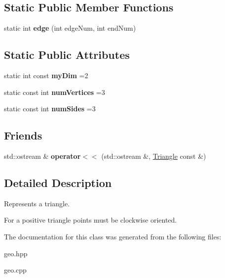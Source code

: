 \subsection*{Static Public Member Functions}
\begin{DoxyCompactItemize}
\item 
\hypertarget{classGeometry_1_1Triangle_a5a2841006b4fc7c7fdaeed465a3d6022}{static int {\bfseries edge} (int edge\-Num, int end\-Num)}\label{classGeometry_1_1Triangle_a5a2841006b4fc7c7fdaeed465a3d6022}

\end{DoxyCompactItemize}
\subsection*{Static Public Attributes}
\begin{DoxyCompactItemize}
\item 
\hypertarget{classGeometry_1_1Triangle_adeadc57151f9219dbcb15331cc493358}{static int const {\bfseries my\-Dim} =2}\label{classGeometry_1_1Triangle_adeadc57151f9219dbcb15331cc493358}

\item 
\hypertarget{classGeometry_1_1Triangle_a4804d3a14277f1dd0e67f082acfd093c}{static const int {\bfseries num\-Vertices} =3}\label{classGeometry_1_1Triangle_a4804d3a14277f1dd0e67f082acfd093c}

\item 
\hypertarget{classGeometry_1_1Triangle_a335cfc0f7a8e8115ef6734a1ad669053}{static const int {\bfseries num\-Sides} =3}\label{classGeometry_1_1Triangle_a335cfc0f7a8e8115ef6734a1ad669053}

\end{DoxyCompactItemize}
\subsection*{Friends}
\begin{DoxyCompactItemize}
\item 
\hypertarget{classGeometry_1_1Triangle_a93d57570a22ade3a22d7d7926929bcf0}{std\-::ostream \& {\bfseries operator$<$$<$} (std\-::ostream \&, \hyperlink{classGeometry_1_1Triangle}{Triangle} const \&)}\label{classGeometry_1_1Triangle_a93d57570a22ade3a22d7d7926929bcf0}

\end{DoxyCompactItemize}


\subsection{Detailed Description}
Represents a triangle. 

For a positive triangle points must be clockwise oriented. 

The documentation for this class was generated from the following files\-:\begin{DoxyCompactItemize}
\item 
geo.\-hpp\item 
geo.\-cpp\end{DoxyCompactItemize}

